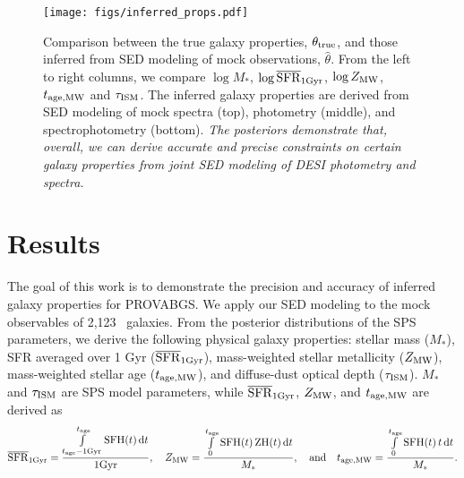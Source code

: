 \begin{figure}
\begin{center}
\texttt{[image: figs/inferred\_props.pdf]}
\caption{
    Comparison between the true galaxy properties, $\theta_{\rm true}$, and
    those inferred from SED modeling of mock observations, $\hat{\theta}$. 
    From the left to right columns, we compare $\log M_*$, $\log \overline{\rm SFR}_{\rm 1Gyr}$, 
    $\log Z_{\rm MW}$, $t_{\rm age, MW}$ and $\tau_{\rm ISM}$. 
    The inferred galaxy properties are derived from SED modeling of mock
    spectra (top), photometry (middle), and spectrophotometry (bottom). 
    \emph{The posteriors demonstrate that, overall, we can derive accurate and 
    precise constraints on certain galaxy properties from joint SED modeling of
    DESI photometry and spectra.}
    } \label{fig:prop_inf}
\end{center}
\end{figure}

\section{Results} \label{sec:results}
The goal of this work is to demonstrate the precision and accuracy of inferred
galaxy properties for PROVABGS. 
We apply our SED modeling to the mock observables of 2,123 \lgal~galaxies.
From the posterior distributions of the SPS parameters, we derive the following
physical galaxy properties: stellar mass ($M_*$), SFR averaged over 1 Gyr
($\overline{\rm SFR}_{\rm 1Gyr}$), mass-weighted stellar metallicity ($Z_{\rm MW}$), mass-weighted
stellar age ($t_{\rm age, MW}$), and diffuse-dust optical depth ($\tau_{\rm ISM}$).
$M_*$ and $\tau_{\rm ISM}$ are SPS model parameters, while $\overline{\rm SFR}_{\rm 1Gyr}$, 
$Z_{\rm MW}$, and $t_{\rm age, MW}$ are derived as 
\begin{equation} \label{eq:prop_eqs}
    \avgsfr = \frac{\int\limits_{t_{\rm age} - {\rm 1 Gyr}}^{t_{\rm age}}{\rm
    SFH}(t)\,{\rm d}t}{{\rm 1 Gyr}}, \quad
    Z_{\rm MW} = \frac{\int\limits_0^{t_{\rm age}}{\rm SFH}(t)\,{\rm
    ZH}(t)\,{\rm d}t}{M_*}, \quad{\rm and}\quad
    \tage = \frac{\int\limits_0^{t_{\rm age}}{\rm SFH}(t)\,t\,{\rm d}t}{M_*}.
\end{equation} 

